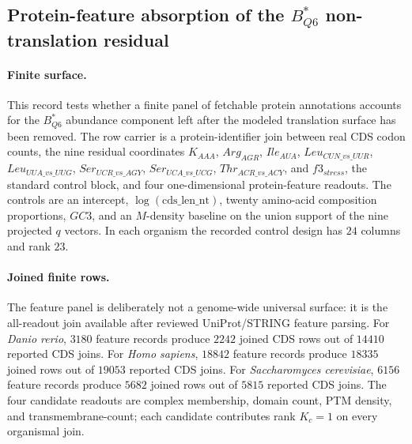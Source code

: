 \subsection{Protein-feature absorption of the $B^*_{Q6}$ non-translation residual}\label{subsec:bioreality-q6-protein-feature-absorption}

\paragraph{Finite surface.}
This record tests whether a finite panel of fetchable protein annotations accounts for the $B^*_{Q6}$ abundance component left after the modeled translation surface has been removed. The row carrier is a protein-identifier join between real CDS codon counts, the nine residual coordinates
$K_{AAA}$, $Arg_{AGR}$, $Ile_{AUA}$, $Leu_{CUN\_vs\_UUR}$, $Leu_{UUA\_vs\_UUG}$, $Ser_{UCR\_vs\_AGY}$, $Ser_{UCA\_vs\_UCG}$, $Thr_{ACR\_vs\_ACY}$, and $f3_{stress}$, the standard control block, and four one-dimensional protein-feature readouts. The controls are an intercept, $\log(\mathrm{cds\_len\_nt})$, twenty amino-acid composition proportions, $GC3$, and an $M$-density baseline on the union support of the nine projected $q$ vectors. In each organism the recorded control design has $24$ columns and rank $23$.

\paragraph{Joined finite rows.}
The feature panel is deliberately not a genome-wide universal surface: it is the all-readout join available after reviewed UniProt/STRING feature parsing. For \emph{Danio rerio}, $3180$ feature records produce $2242$ joined CDS rows out of $14410$ reported CDS joins. For \emph{Homo sapiens}, $18842$ feature records produce $18335$ joined rows out of $19053$ reported CDS joins. For \emph{Saccharomyces cerevisiae}, $6156$ feature records produce $5682$ joined rows out of $5815$ reported CDS joins. The four candidate readouts are complex membership, domain count, PTM density, and transmembrane-count; each candidate contributes rank $K_c=1$ on every organismal join.

